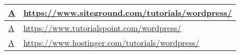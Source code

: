 \begin{table}[]
{\begin{tabular}{|l|p{20cm}|}
  \href{https://web.archive.org/web/20190213173658/https://www.siteground.com/tutorials/wordpress/}{A}                                                         & \href{https://www.siteground.com/tutorials/wordpress/}{https://www.siteground.com/tutorials/wordpress/}                                                   \\ \hline
  \href{https://web.archive.org/web/20190213173717/https://www.tutorialspoint.com/wordpress/}{A}                                                               & \href{https://www.tutorialspoint.com/wordpress/}{https://www.tutorialspoint.com/wordpress/}                                                   \\ \hline
  \href{https://web.archive.org/web/20190213173749/https://www.hostinger.com/tutorials/wordpress/}{A}                                                          & \href{https://www.hostinger.com/tutorials/wordpress/}{https://www.hostinger.com/tutorials/wordpress/}                                                   \\ \hline
\end{tabular}
}
\end{table}

